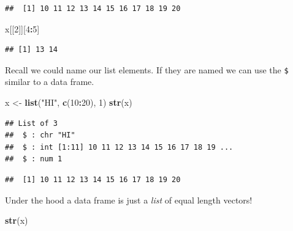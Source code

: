 \documentclass[
]{book}
\newenvironment{Shaded}{\begin{snugshade}}{\end{snugshade}}
\newcommand{\DataTypeTok}[1]{\textcolor[rgb]{0.13,0.29,0.53}{#1}}
\newcommand{\DecValTok}[1]{\textcolor[rgb]{0.00,0.00,0.81}{#1}}
\newcommand{\KeywordTok}[1]{\textcolor[rgb]{0.13,0.29,0.53}{\textbf{#1}}}
\newcommand{\NormalTok}[1]{#1}
\newcommand{\OperatorTok}[1]{\textcolor[rgb]{0.81,0.36,0.00}{\textbf{#1}}}
\newcommand{\StringTok}[1]{\textcolor[rgb]{0.31,0.60,0.02}{#1}}
\theoremstyle{definition}
\theoremstyle{definition}
\theoremstyle{definition}
\theoremstyle{remark}
\begin{document}
\begin{verbatim}
##  [1] 10 11 12 13 14 15 16 17 18 19 20
\end{verbatim}

\begin{Shaded}
\begin{Highlighting}[]
\NormalTok{x[[}\DecValTok{2}\NormalTok{]][}\DecValTok{4}\OperatorTok{:}\DecValTok{5}\NormalTok{]}
\end{Highlighting}
\end{Shaded}

\begin{verbatim}
## [1] 13 14
\end{verbatim}

Recall we could name our list elements. If they are named we can use the \texttt{\$} similar to a data frame.

\begin{Shaded}
\begin{Highlighting}[]
\NormalTok{x <-}\StringTok{ }\KeywordTok{list}\NormalTok{(}\StringTok{"HI"}\NormalTok{, }\KeywordTok{c}\NormalTok{(}\DecValTok{10}\OperatorTok{:}\DecValTok{20}\NormalTok{), }\DecValTok{1}\NormalTok{)}
\KeywordTok{str}\NormalTok{(x)}
\end{Highlighting}
\end{Shaded}

\begin{verbatim}
## List of 3
##  $ : chr "HI"
##  $ : int [1:11] 10 11 12 13 14 15 16 17 18 19 ...
##  $ : num 1
\end{verbatim}

\begin{Shaded}
\end{Shaded}

\begin{verbatim}
##  [1] 10 11 12 13 14 15 16 17 18 19 20
\end{verbatim}

Under the hood a data frame is just a \emph{list} of equal length vectors!

\begin{Shaded}
\begin{Highlighting}[]
\KeywordTok{str}\NormalTok{(x)}
\end{Highlighting}
\end{Shaded}
\end{document}
